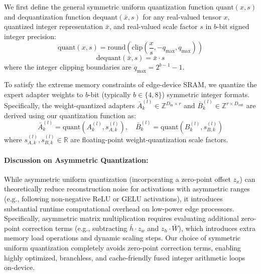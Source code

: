 We first define the general symmetric uniform quantization function $\text{quant}(x, s)$ and dequantization function $\text{dequant}(\bar{x}, s)$ for any real-valued tensor $x$, quantized integer representation $\bar{x}$, and real-valued scale factor $s$ in $b$-bit signed integer precision:
\begin{equation}
  \text{quant}(x, s) = \text{round}\left( \text{clip}\left(\frac{x}{s}, -q_{\text{max}}, q_{\text{max}}\right) \right)
\end{equation}
\begin{equation}
  \text{dequant}(\bar{x}, s) = \bar{x} \cdot s
\end{equation}
where the integer clipping boundaries are $q_{\text{max}} = 2^{b-1} - 1$.

To satisfy the extreme memory constraints of edge-device SRAM, we quantize the expert adapter weights to $b$-bit (typically $b \in \{4, 8\}$) symmetric integer formats. Specifically, the weight-quantized adapters $\bar{A}_k^{(l)} \in \mathbb{Z}^{D_{\text{in}} \times r}$ and $\bar{B}_k^{(l)} \in \mathbb{Z}^{r \times D_{\text{out}}}$ are derived using our quantization function as:
\begin{equation}
  \bar{A}_k^{(l)} = \text{quant}\left(A_k^{(l)}, s_{A, k}^{(l)}\right), \quad \bar{B}_k^{(l)} = \text{quant}\left(B_k^{(l)}, s_{B, k}^{(l)}\right)
\end{equation}
where $s_{A, k}^{(l)}, s_{B, k}^{(l)} \in \mathbb{R}$ are floating-point weight-quantization scale factors.

\paragraph{Discussion on Asymmetric Quantization:} While asymmetric uniform quantization (incorporating a zero-point offset $z_x$) can theoretically reduce reconstruction noise for activations with asymmetric ranges (e.g., following non-negative ReLU or GELU activations), it introduces substantial runtime computational overhead on low-power edge processors. Specifically, asymmetric matrix multiplication requires evaluating additional zero-point correction terms (e.g., subtracting $\bar{h} \cdot z_w$ and $z_h \cdot \bar{W}$), which introduces extra memory load operations and dynamic scaling steps. Our choice of symmetric uniform quantization completely avoids zero-point correction terms, enabling highly optimized, branchless, and cache-friendly fused integer arithmetic loops on-device.

